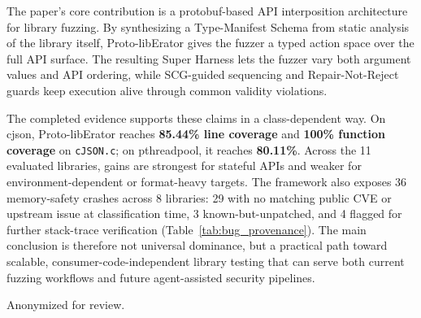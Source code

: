 \documentclass[sigconf,anonymous]{acmart}
\begin{document}
The paper's core contribution is a protobuf-based API interposition
architecture for library fuzzing.  By synthesizing a Type-Manifest Schema
from static analysis of the library itself, Proto-libErator gives the
fuzzer a typed action space over the full API surface.  The resulting
Super Harness lets the fuzzer vary both argument values and API ordering,
while SCG-guided sequencing and Repair-Not-Reject guards keep execution
alive through common validity violations.

The completed evidence supports these claims in a class-dependent way.
On cjson, Proto-libErator reaches \textbf{85.44\% line coverage} and
\textbf{100\% function coverage} on \texttt{cJSON.c}; on pthreadpool, it
reaches \textbf{80.11\%}. Across the 11 evaluated libraries, gains are
strongest for stateful APIs and weaker for environment-dependent or
format-heavy targets.  The framework also exposes 36 memory-safety crashes across 8 libraries:
29 with no matching public CVE or upstream issue at classification time,
3 known-but-unpatched, and 4 flagged for further stack-trace verification
(Table~\ref{tab:bug_provenance}).  The main
conclusion is therefore not universal dominance, but a practical path
toward scalable, consumer-code-independent library testing that can serve
both current fuzzing workflows and future agent-assisted security
pipelines.

\begin{acks}
Anonymized for review.
\end{acks}




\clearpage
\appendix




\end{document}
